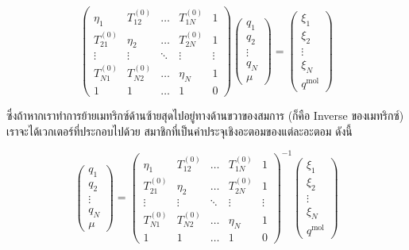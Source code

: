 \begin{equation}
    \left(\begin{array}{ccccc}
        \eta_1 & T_{12}^{(0)} & \ldots & T_{1 N}^{(0)} & 1 \\
        T_{21}^{(0)} & \eta_2 & \ldots & T_{2 N}^{(0)} & 1 \\
        \vdots & \vdots & \ddots & \vdots & \vdots \\
        T_{N 1}^{(0)} & T_{N 2}^{(0)} & \ldots & \eta_N & 1 \\
        1 & 1 & \ldots & 1 & 0
    \end{array}\right)\left(\begin{array}{c}
        q_1 \\
        q_2 \\
        \vdots \\
        q_N \\
        \mu
    \end{array}\right)
    =
    \left(\begin{array}{c}
        \xi_1 \\
        \xi_2 \\
        \vdots \\
        \xi_N \\
        q^{\mathrm{mol}}
    \end{array}\right)
\end{equation}

\noindent ซึ่งถ้าหากเราทำการย้ายเมทริกซ์ด้านซ้ายสุดไปอยู่ทางด้านขวาของสมการ (ก็คือ Inverse ของเมทริกซ์) เราจะได้เวกเตอร์ที่ประกอบไปด้วย%
สมาชิกที่เป็นค่าประจุเชิงอะตอมของแต่ละอะตอม ดังนี้ 

\begin{equation}
    \left(\begin{array}{c}
        q_1 \\
        q_2 \\
        \vdots \\
        q_N \\
        \mu
    \end{array}\right)
    =
    \left(\begin{array}{ccccc}
        \eta_1 & T_{12}^{(0)} & \ldots & T_{1 N}^{(0)} & 1 \\
T_{21}^{(0)} & \eta_2 & \ldots & T_{2 N}^{(0)} & 1 \\
\vdots & \vdots & \ddots & \vdots & \vdots \\
T_{N 1}^{(0)} & T_{N 2}^{(0)} & \ldots & \eta_N & 1 \\
1 & 1 & \ldots & 1 & 0
\end{array}\right)^{-1}\left(\begin{array}{c}
    \xi_1 \\
    \xi_2 \\
    \vdots \\
    \xi_N \\
    q^{\mathrm{mol}}
\end{array}\right) 
\end{equation}


